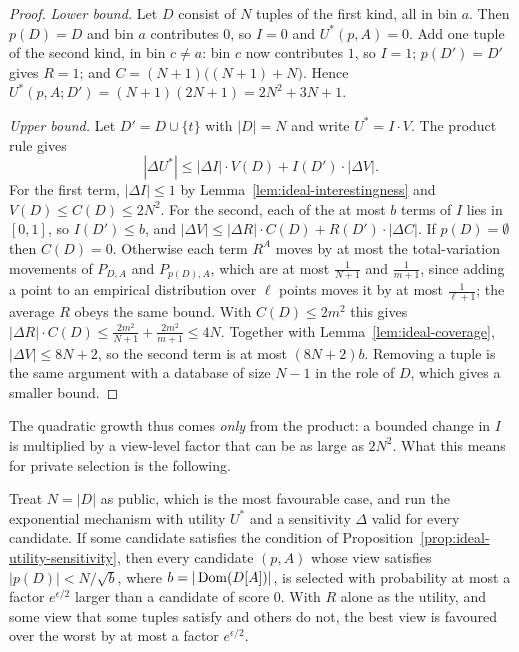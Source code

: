 \begin{proof}
\emph{Lower bound.}
Let $D$ consist of $N$ tuples of the first kind, all in bin $a$.
Then $p(D)=D$ and bin $a$ contributes $0$, so $I=0$ and $U^*(p,A)=0$.
Add one tuple of the second kind, in bin $c\neq a$: bin $c$ now contributes $1$, so $I=1$; $p(D')=D'$ gives $R=1$; and $C=(N+1)\big((N+1)+N\big)$.
Hence $U^*(p,A;D')=(N+1)(2N+1)=2N^2+3N+1$.

\emph{Upper bound.}
Let $D'=D\cup\{t\}$ with $|D|=N$ and write $U^*=I\cdot V$.
The product rule gives
\[
|\Delta U^*|\le|\Delta I|\cdot V(D)+I(D')\cdot|\Delta V|.
\]
For the first term, $|\Delta I|\le1$ by Lemma~\ref{lem:ideal-interestingness} and $V(D)\le C(D)\le2N^2$.
For the second, each of the at most $b$ terms of $I$ lies in $[0,1]$, so $I(D')\le b$, and $|\Delta V|\le|\Delta R|\cdot C(D)+R(D')\cdot|\Delta C|$.
If $p(D)=\emptyset$ then $C(D)=0$.
Otherwise each term $R^A$ moves by at most the total-variation movements of $P_{D,A}$ and $P_{p(D),A}$, which are at most $\tfrac1{N+1}$ and $\tfrac1{m+1}$, since adding a point to an empirical distribution over $\ell$ points moves it by at most $\tfrac1{\ell+1}$; the average $R$ obeys the same bound.
With $C(D)\le2m^2$ this gives $|\Delta R|\cdot C(D)\le\tfrac{2m^2}{N+1}+\tfrac{2m^2}{m+1}\le4N$.
Together with Lemma~\ref{lem:ideal-coverage}, $|\Delta V|\le8N+2$, so the second term is at most $(8N+2)b$.
Removing a tuple is the same argument with a database of size $N-1$ in the role of $D$, which gives a smaller bound.
\end{proof}

The quadratic growth thus comes \emph{only} from the product: a bounded change in $I$ is multiplied by a view-level factor that can be as large as $2N^2$.
What this means for private selection is the following.

\begin{corollary}
\label{cor:ideal-em}
Treat $N=|D|$ as public, which is the most favourable case, and run the exponential mechanism with utility $U^*$ and a sensitivity $\Delta$ valid for every candidate.
If some candidate satisfies the condition of Proposition~\ref{prop:ideal-utility-sensitivity}, then every candidate $(p,A)$ whose view satisfies $|p(D)|<N/\sqrt{b}$, where $b=|\operatorname{Dom}(D[A])|$, is selected with probability at most a factor $e^{\epsilon/2}$ larger than a candidate of score $0$.
With $R$ alone as the utility, and some view that some tuples satisfy and others do not, the best view is favoured over the worst by at most a factor $e^{\epsilon/2}$.
\end{corollary}

